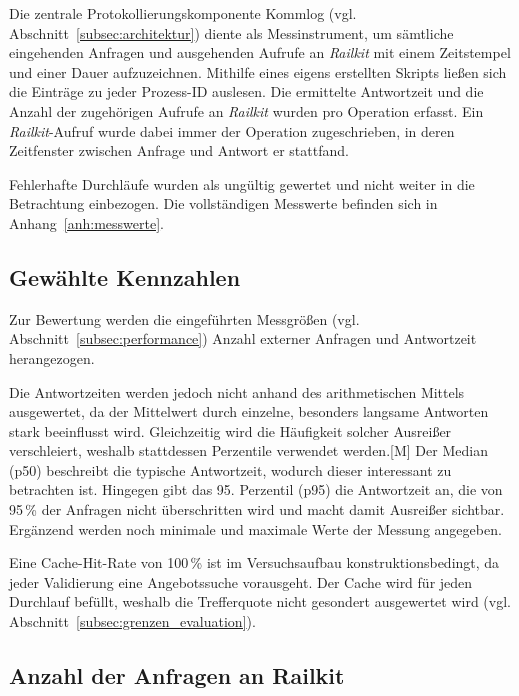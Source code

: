 Die zentrale Protokollierungskomponente Kommlog (vgl. Abschnitt~\ref{subsec:architektur}) diente als Messinstrument, um sämtliche eingehenden Anfragen und ausgehenden Aufrufe an \textit{Railkit} mit einem Zeitstempel und einer Dauer aufzuzeichnen. Mithilfe eines eigens erstellten Skripts ließen sich die Einträge zu jeder Prozess-ID auslesen. Die ermittelte Antwortzeit und die Anzahl der zugehörigen Aufrufe an \textit{Railkit} wurden pro Operation erfasst. Ein \textit{Railkit}-Aufruf wurde dabei immer der Operation zugeschrieben, in deren Zeitfenster zwischen Anfrage und Antwort er stattfand.

Fehlerhafte Durchläufe wurden als ungültig gewertet und nicht weiter in die Betrachtung einbezogen. Die vollständigen Messwerte befinden sich in Anhang~\ref{anh:messwerte}. %

\subsection{Gewählte Kennzahlen}
\label{subsec:kennzahlen}

Zur Bewertung werden die eingeführten Messgrößen (vgl. Abschnitt~\ref{subsec:performance}) Anzahl externer Anfragen und Antwortzeit herangezogen.

Die Antwortzeiten werden jedoch nicht anhand des arithmetischen Mittels ausgewertet, da der Mittelwert durch einzelne, besonders langsame Antworten stark beeinflusst wird. Gleichzeitig wird die Häufigkeit solcher Ausreißer verschleiert, weshalb stattdessen Perzentile verwendet werden.[M] %
Der Median (p50) beschreibt die typische Antwortzeit, wodurch dieser interessant zu betrachten ist. Hingegen gibt das 95. Perzentil (p95) die Antwortzeit an, die von 95\,\% der Anfragen nicht überschritten wird und macht damit Ausreißer sichtbar. Ergänzend werden noch minimale und maximale Werte der Messung angegeben.

Eine Cache-Hit-Rate von 100\,\% ist im Versuchsaufbau konstruktionsbedingt, da jeder Validierung eine Angebotssuche vorausgeht. Der Cache wird für jeden Durchlauf befüllt, weshalb die Trefferquote nicht gesondert ausgewertet wird (vgl. Abschnitt~\ref{subsec:grenzen_evaluation}).

\subsection{Anzahl der Anfragen an Railkit}
\label{subsec:ergebnis_anfragen}

